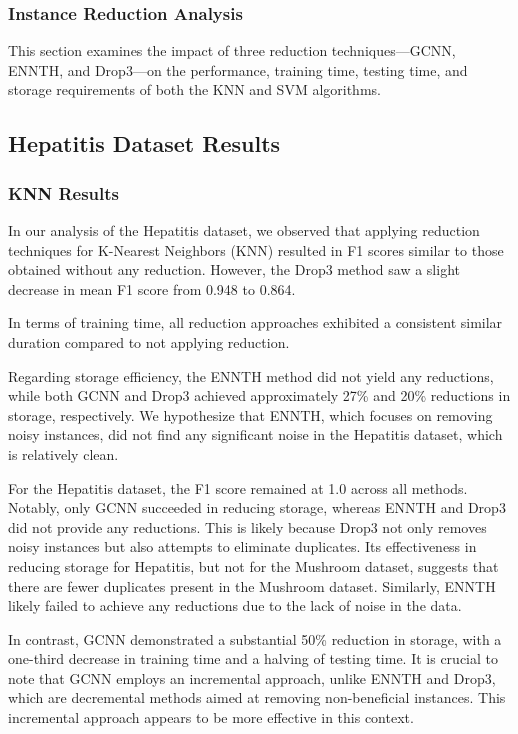 \subsubsection{Instance Reduction Analysis}
\label{subsubsec:discussion-reduction}

This section examines the impact of three reduction techniques—GCNN, ENNTH, and Drop3—on the performance, training time, testing time, and storage requirements of both the KNN and SVM algorithms.

\subsection*{Hepatitis Dataset Results}
\subsubsection*{KNN Results}
In our analysis of the Hepatitis dataset, we observed that applying reduction techniques
for K-Nearest Neighbors (KNN) resulted in F1 scores similar to those obtained without any reduction.
However, the Drop3 method saw a slight decrease in mean F1 score from 0.948 to 0.864. 

In terms of training time, all reduction approaches exhibited a consistent similar duration compared to not applying reduction.

Regarding storage efficiency, the ENNTH method did not yield any reductions, while both GCNN and Drop3 achieved approximately
27\% and 20\% reductions in storage, respectively. We hypothesize that ENNTH, which focuses on removing noisy instances, did not
find any significant noise in the Hepatitis dataset, which is relatively clean.

For the Hepatitis dataset, the F1 score remained at 1.0 across all methods. Notably, only GCNN succeeded in reducing storage,
whereas ENNTH and Drop3 did not provide any reductions. This is likely because Drop3 not only removes noisy instances but also
attempts to eliminate duplicates. Its effectiveness in reducing storage for Hepatitis, but not for the Mushroom dataset, suggests
that there are fewer duplicates present in the Mushroom dataset. Similarly, ENNTH likely failed to achieve any reductions due to the lack of noise in the data.

In contrast, GCNN demonstrated a substantial 50\% reduction in storage, with a one-third decrease in training time and a halving of testing time. It is crucial to note that GCNN employs an incremental approach, unlike ENNTH and Drop3, which are decremental methods aimed at removing non-beneficial instances. This incremental approach appears to be more effective in this context.

